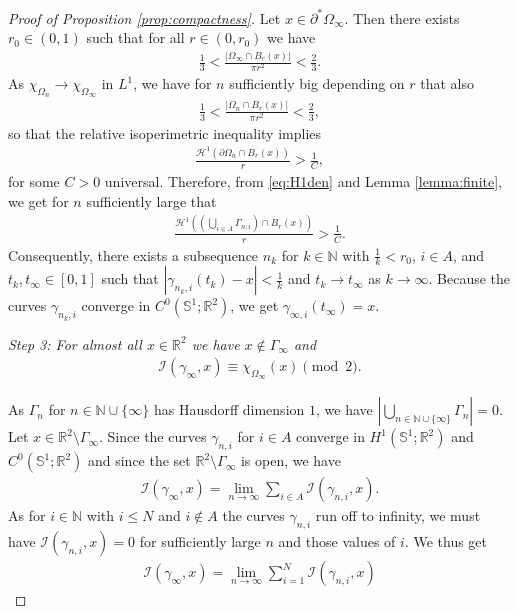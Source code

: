 \documentclass[11pt]{article}
\numberwithin{statement}{section}
\numberwithin{equation}{section}
\theoremstyle{remark}
\newcommand{\R}{\mathbb R} 				%
\newcommand{\N}{\mathbb N}
\newcommand{\Sph}{{\mathbb S}}				%
\begin{document}
\begin{proof}[Proof of Proposition \ref{prop:compactness}]
Let $x \in \partial^* \Omega_\infty$.  Then there exists
$r_0 \in (0,1)$ such that for all $r\in (0,r_0)$ we have
\cite{ambrosio}
	\begin{align}\label{eq:density_bound}
		\frac{1}{3} < \frac{|\Omega_\infty \cap B_r(x)|}{\pi r^2} < \frac{2}{3}.
	\end{align}
        As $\chi_{\Omega_n} \to \chi_{\Omega_\infty}$ in $L^1$, we
        have for $n$ sufficiently big depending on $r$ that also
	 \begin{align}
		\frac{1}{3} < \frac{|\Omega_n \cap B_r(x)|}{\pi r^2} < \frac{2}{3},
	\end{align}
	so that the relative isoperimetric inequality implies
	\begin{align}
          \label{eq:H1den}
          \frac{\mathcal{H}^1(\partial \Omega_n \cap B_r(x) )}{r}
          > \frac{1}{C}, 
	\end{align}
        for some $C > 0$ universal.  Therefore, from
        \eqref{eq:H1den} and Lemma
        \ref{lemma:finite}, we get for $n$ sufficiently large
        that
	\begin{align}
		\frac{\mathcal{H}^1\left(\left(\bigcup_{ i \in A} \Gamma_{n,i} \right) \cap B_r(x) \right)}{r} > \frac{1}{C}.
	\end{align}
	Consequently, there exists a subsequence $n_k$ for $k \in \N$
        with $\frac{1}{k} < r_0$, $i \in A$, and
        $t_k, t_\infty \in [0,1]$ such that
        $|\gamma_{n_k,i}(t_k) -x| < \frac{1}{k}$ and
        $t_k \to t_\infty$ as $k \to \infty$.  Because the curves
        $\gamma_{n_k,i}$ converge in $C^0(\Sph^1;\R^2)$, we get
        $\gamma_{\infty,i}(t_\infty) = x$.

        \textit{Step 3:
        For almost all $x \in \R^2$ we have $ x \not \in \Gamma_\infty$ and
        \begin{align} 
          \mathcal{I}(\gamma_\infty, x) \equiv
          \chi_{\Omega_\infty}(x) \pmod{2}. 
        \end{align}}


      As $\Gamma_n$ for $n \in \N \cup \{\infty\}$ has Hausdorff
      dimension $1$, we have
      $\left| \bigcup_{n\in \N \cup \{\infty\}} \Gamma_n \right| =0$.
      Let $ x \in \R^2 \setminus \Gamma_\infty$.  Since the curves
      $\gamma_{n,i}$ for $i\in A$ converge in $H^1(\Sph^1; \R^2)$ and
      $C^0(\Sph^1; \R^2)$ and since the set
      $\R^2 \setminus \Gamma_\infty$ is open, we have
	\begin{align}
		\mathcal{I}(\gamma_\infty, x) = \lim_{n \to \infty} \sum_{i\in A} \mathcal{I}(\gamma_{n,i},  x).
	\end{align}
	As for $i \in \N$ with $i \leq N$ and $i \not \in A$ the
        curves $\gamma_{n,i}$ run off to infinity, we must have
        $\mathcal{I}(\gamma_{n,i}, x)=0$ for sufficiently large $n$
        and those values of $i$.  We thus get
	\begin{align}
		\mathcal{I}(\gamma_\infty,  x) = \lim_{n \to \infty} \sum_{i=1}^{N} \mathcal{I}(\gamma_{n,i},  x) 
	\end{align}
	

\end{proof}
\end{document}
